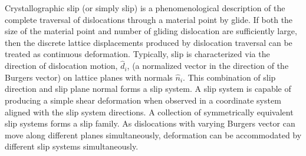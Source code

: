 \documentclass[preprint,3p,times,sort&compress,letterpaper,12pt]{elsarticle} %
\begin{document}
Crystallographic slip (or simply slip) is a phenomenological description of the complete traversal of dislocations through a material point by glide. If both the size of the material point and number of gliding dislocation are sufficiently large, then the discrete lattice displacements produced by dislocation traversal can be treated as continuous deformation. Typically, slip is characterized via the direction of dislocation motion, $\hat{d}_i$, (a normalized vector in the direction of the Burgers vector) on lattice planes with normals $\hat{n}_i$. This combination of slip direction and slip plane normal forms a slip system. A slip system is capable of producing a simple shear deformation when observed in a coordinate system aligned with the slip system directions. A collection of symmetrically equivalent slip systems forms a slip family. As dislocations with varying Burgers vector can move along different planes simultaneously, deformation can be accommodated by different slip systems simultaneously.
\end{document}
